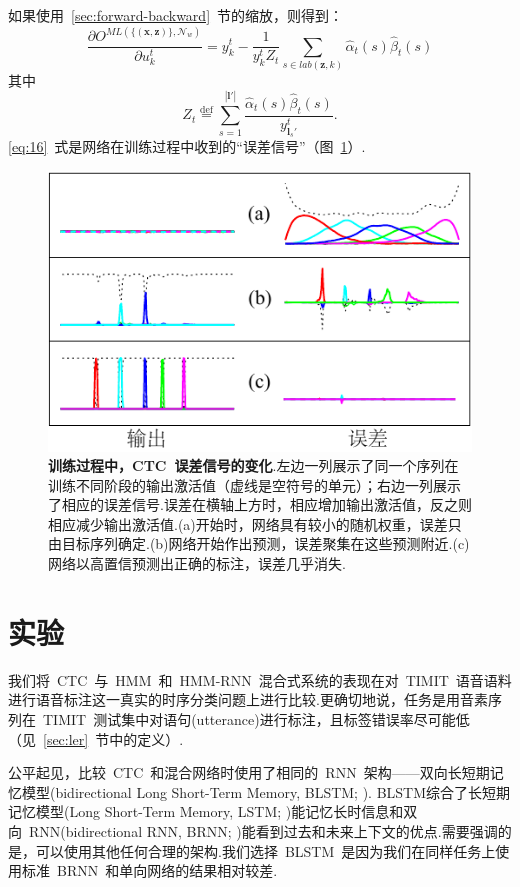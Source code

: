 \documentclass{ctexart}
\def\cN{\mathcal{N}}
\def\vl{\mathbf{l}}
\def\vx{\mathbf{x}}
\def\vz{\mathbf{z}}
\def\defeq{\overset{\mathrm{def}}{=}}
\begin{document}
如果使用~\ref{sec:forward-backward}~节的缩放，则得到：
\begin{equation}
	\label{eq:16}
	\frac{\partial O^{\textit{ML}(\{(\vx,\vz)\},\cN_w)}}{\partial u_k^t} = 
	y_k^t - \frac{1}{y_k^tZ_t}\sum_{s\in\textit{lab}(\vz,k)}\hat{\alpha}_t(s)\hat{\beta}_t(s)
\end{equation}
其中
\[Z_t \defeq \sum_{s=1}^{|\vl'|}\frac{\hat{\alpha}_t(s)\hat{\beta}_t(s)}{y_{\vl_s'}^t}.\]
\eqref{eq:16}~式是网络在训练过程中收到的“误差信号”（图~\ref{fig:4}）.
\begin{figure}
	\label{fig:4}
	\centering
	\includegraphics[width=\columnwidth]{fig/4}
	\caption{\textbf{训练过程中，CTC~误差信号的变化}.左边一列展示了同一个序列在训练不同阶段的输出激活值（虚线是空符号的单元）；右边一列展示了相应的误差信号.误差在横轴上方时，相应增加输出激活值，反之则相应减少输出激活值.(a)开始时，网络具有较小的随机权重，误差只由目标序列确定.(b)网络开始作出预测，误差聚集在这些预测附近.(c)网络以高置信预测出正确的标注，误差几乎消失.}
\end{figure}
\section{实验}
\label{sec:experiments}
我们将~CTC~与~HMM~和~HMM-RNN~混合式系统的表现在对~TIMIT~语音语料进行语音标注这一真实的时序分类问题上进行比较.更确切地说，任务是用音素序列在~TIMIT~测试集中对语句(utterance)进行标注，且标签错误率尽可能低（见~\ref{sec:ler}~节中的定义）.

公平起见，比较~CTC~和混合网络时使用了相同的~RNN~架构——双向长短期记忆模型(bidirectional Long Short-Term Memory, BLSTM; \citealp{graves2005bidirectional}). BLSTM综合了长短期记忆模型(Long Short-Term Memory, LSTM; \citealp{hochreiter1997long})能记忆长时信息和双向~RNN(bidirectional RNN, BRNN; \citealp{schuster1997bidirectional})能看到过去和未来上下文的优点.需要强调的是，可以使用其他任何合理的架构.我们选择~BLSTM~是因为我们在同样任务上使用标准~BRNN~和单向网络的结果相对较差.
\end{document}
